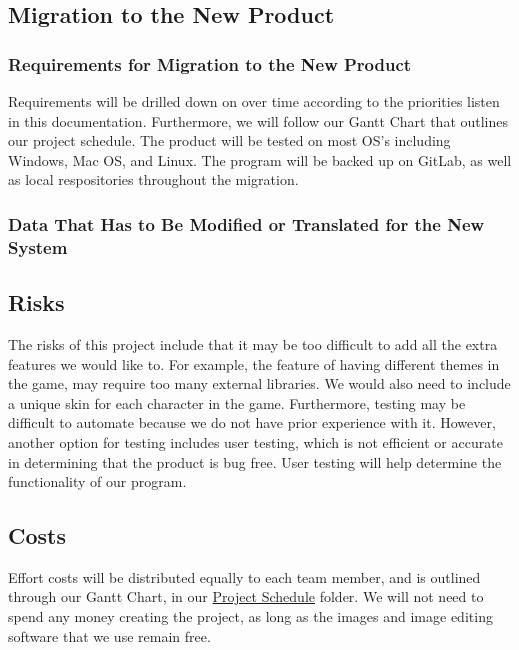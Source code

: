\documentclass[12pt, titlepage]{article}
\begin{document}
\subsection{Migration to the New Product}

\subsubsection{Requirements for Migration to the New Product}

Requirements will be drilled down on over time according to the priorities listen in this documentation. Furthermore, we will follow our Gantt Chart that outlines our project schedule. The product will be tested on most OS's including Windows, Mac OS, and Linux. The program will be backed up on GitLab, as well as local respositories throughout the migration. 

\subsubsection{Data That Has to Be Modified or Translated for the New System}

\subsection{Risks}

The risks of this project include that it may be too difficult to add all the extra features we would like to. For example, the feature of having different themes in the game, may require too many external libraries. We would also need to include a unique skin for each character in the game. Furthermore, testing may be difficult to automate because we do not have prior experience with it. However, another option for testing includes user testing, which is not efficient or accurate in determining that the product is bug free. User testing will help determine the functionality of our program. 

\subsection{Costs}

Effort costs will be distributed equally to each team member, and is outlined through our Gantt Chart, in our \href{https://gitlab.cas.mcmaster.ca/kalerg1/se3xa3/tree/master/Sokoban-Game/ProjectSchedule}{Project Schedule} folder. We will not need to spend any money creating the project, as long as the images and image editing software that we use remain free.
\end{document}
